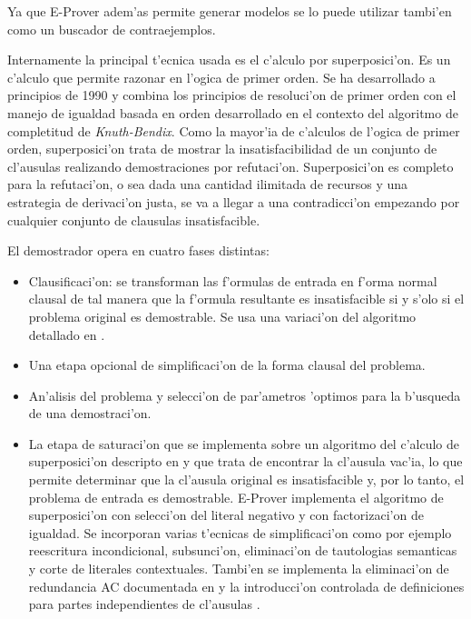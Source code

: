 Ya que E-Prover adem'as permite generar modelos se lo puede utilizar tambi'en como un buscador de contraejemplos.

Internamente la principal t'ecnica usada es el c'alculo por superposici'on. Es un c'alculo que permite razonar en l'ogica de primer orden. Se ha desarrollado a principios de 1990 y combina los principios de resoluci'on de primer orden con el manejo de igualdad basada en orden desarrollado en el contexto del algoritmo de completitud de \textit{Knuth-Bendix}\cite{knuthbendix}. Como la mayor'ia de c'alculos de l'ogica de primer orden, superposici'on trata de mostrar la insatisfacibilidad de un conjunto de cl'ausulas realizando demostraciones por refutaci'on. Superposici'on es completo para la refutaci'on, o sea dada una cantidad ilimitada de recursos y una estrategia de derivaci'on justa, se va a llegar a una contradicci'on empezando por cualquier conjunto de clausulas insatisfacible.

El demostrador opera en cuatro fases distintas:
\begin{itemize}
\item Clausificaci'on: se transforman las f'ormulas de entrada en f'orma normal clausal de tal manera que la f'ormula resultante es insatisfacible si y s'olo si el problema original es demostrable. Se usa una variaci'on del algoritmo detallado en \cite{smallcnf2001}.

\item Una etapa opcional de simplificaci'on de la forma clausal del problema.

\item An'alisis del problema y selecci'on de par'ametros 'optimos para la b'usqueda de una demostraci'on.

\item La etapa de saturaci'on que se implementa sobre un algoritmo del c'alculo de superposici'on descripto en \cite{bg94} y \cite{aicom2002} que trata de encontrar la cl'ausula vac'ia, lo que permite determinar que la cl'ausula original es insatisfacible y, por lo tanto, el problema de entrada es demostrable. E-Prover implementa el algoritmo de superposici'on con selecci'on del literal negativo y con factorizaci'on de igualdad. Se incorporan varias t'ecnicas de simplificaci'on como por ejemplo reescritura incondicional, subsunci'on, eliminaci'on de tautologias semanticas y corte de literales contextuales. Tambi'en se implementa la eliminaci'on de redundancia AC documentada en \cite{jsc2003} y la introducci'on controlada de definiciones para partes independientes de cl'ausulas \cite{ijcai2001}.
\end{itemize}

